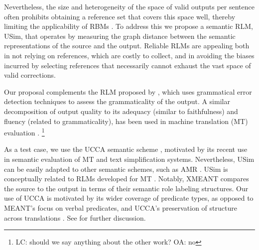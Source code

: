 \documentclass[a4paper, 11pt]{article}
\newcommand{\lc}[1]{\footnote{\color{blue}LC: #1}}
\begin{document}
Nevertheless, the size and heterogeneity of the space of valid outputs per sentence often prohibits
obtaining a reference set that covers this space well, thereby limiting the applicability
of RBMs \cite{bryant2015far}.
To address this we propose a semantic RLM, {\sc USim}, that
operates by measuring the graph distance between the semantic
representations of the source and the output.
Reliable RLMs are appealing both in not relying on references, which are costly to collect, and in avoiding the biases incurred by selecting references that necessarily cannot exhaust the vast space of valid corrections.

Our proposal complements the RLM proposed by 
, which uses grammatical error detection techniques to assess the grammaticality of the output.
A similar decomposition of output quality to its adequacy (similar to faithfulness)
and fluency (related to grammaticality), has been used in machine translation (MT)
evaluation \cite[e.g.,][]{banchs2015adequacy}.
\lc{should we say anything about the other work? OA: no}	

As a test case, we use the UCCA semantic scheme \cite{abend2013universal},
motivated by its recent use in semantic evaluation of MT \cite{birch2016hume} and text simplification \cite{Elior} systems.
Nevertheless, {\sc USim} can be easily adapted to other semantic schemes, such as AMR \cite{banarescu-EtAl:2013:LAW7-ID}.
{\sc USim} is conceptually related to RLMs developed
for MT
\cite{reeder2006measuring,albrecht2007regression,specia2009estimating,specia2010machine}.
Notably, XMEANT \cite{lo2014xmeant} compares the source to the output
in terms of their semantic role labeling structures.
Our use of UCCA is motivated by its wider coverage of predicate types, as opposed to 
MEANT's focus on verbal predicates, and UCCA's preservation
of structure across translations \cite{sulem2015conceptual}.
See \cite{birch2016hume} for further discussion. 


\end{document}
